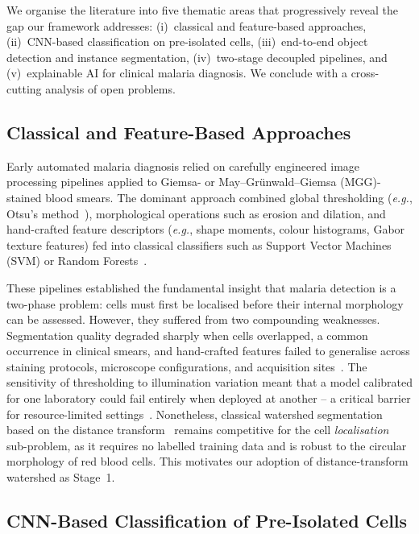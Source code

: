 \documentclass[10pt,twocolumn]{article}
\newcommand{\eg}{\textit{e.g.}}
\begin{document}
We organise the literature into five thematic areas that progressively reveal
the gap our framework addresses: (i)~classical and feature-based approaches,
(ii)~CNN-based classification on pre-isolated cells, (iii)~end-to-end
object detection and instance segmentation, (iv)~two-stage decoupled
pipelines, and (v)~explainable AI for clinical malaria diagnosis. We
conclude with a cross-cutting analysis of open problems.

\subsection{Classical and Feature-Based Approaches}
\label{ssec:classical}

Early automated malaria diagnosis relied on carefully engineered image
processing pipelines applied to Giemsa- or May--Gr\"{u}nwald--Giemsa
(MGG)-stained blood smears. The dominant approach combined global
thresholding (\eg, Otsu's method~\cite{otsu1979}), morphological
operations such as erosion and dilation, and hand-crafted feature
descriptors (\eg, shape moments, colour histograms, Gabor texture
features) fed into classical classifiers such as Support Vector Machines
(SVM) or Random Forests~\cite{poostchi2018}.

These pipelines established the fundamental insight that malaria detection
is a two-phase problem: cells must first be localised before their internal
morphology can be assessed. However, they suffered from two compounding
weaknesses. Segmentation quality degraded sharply when cells overlapped,
a common occurrence in clinical smears, and hand-crafted features failed
to generalise across staining protocols, microscope configurations, and
acquisition sites~\cite{poostchi2018,delgado2020}. The sensitivity of
thresholding to illumination variation meant that a model calibrated for
one laboratory could fail entirely when deployed at another -- a critical
barrier for resource-limited settings~\cite{continuallearning2025}.
Nonetheless, classical watershed segmentation based on the distance
transform~\cite{beucher1992} remains competitive for the cell \emph{localisation}
sub-problem, as it requires no labelled training data and is robust to
the circular morphology of red blood cells. This motivates our adoption
of distance-transform watershed as Stage~1.

\subsection{CNN-Based Classification of Pre-Isolated Cells}
\label{ssec:cnn_class}
\end{document}
